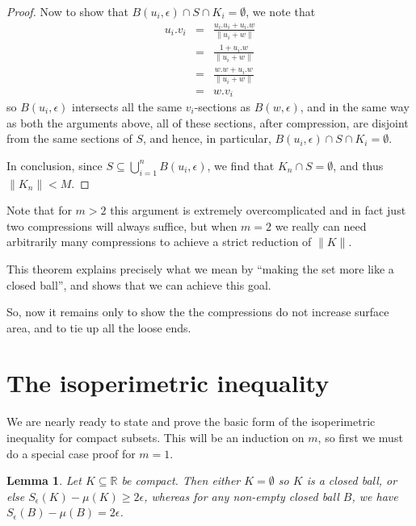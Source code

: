 \documentclass[a4paper,11pt]{article}
\newcommand{\bbR}{\mathbb{R}}
\newcommand{\lV}{\lVert}
\newcommand{\rV}{\rVert}
\newtheorem{lemma}[thm]{Lemma}
\begin{document}
\begin{proof}
Now to show that $B(u_i,\epsilon)\cap S\cap K_{i}=\emptyset$, we note that
%
\begin{eqnarray*}
  u_i.v_i
  &=& \frac{u_i.u_i+u_i.w}{\lV u_i+w\rV} \\
  &=& \frac{1+u_i.w}{\lV u_i+w\rV} \\
  &=& \frac{w.w+u_i.w}{\lV u_i+w\rV} \\
  &=& w.v_i
\end{eqnarray*}
%
so $B(u_i,\epsilon)$ intersects all the same $v_i$-sections as
$B(w,\epsilon)$, and in the same way as both the arguments above,
all of these sections, after
compression, are disjoint from the same sections of $S$, and hence,
in particular,
$B(u_i,\epsilon)\cap S\cap K_{i}=\emptyset$.

In conclusion, since $S\subseteq\bigcup_{i=1}^n B(u_i,\epsilon)$, we find
that $K_n\cap S=\emptyset$, and thus $\lV K_n\rV<M$.
\end{proof}

Note that for $m>2$ this argument is extremely overcomplicated and in fact just
two compressions will always suffice, but when $m=2$ we really can need
arbitrarily many compressions to achieve a strict reduction of $\lV K\rV$.

This theorem explains precisely what we mean by ``making the set more like a
closed ball'', and shows that we can achieve this goal.

So, now it remains only to show the the compressions do not increase surface
area, and to tie up all the loose ends.

\section{The isoperimetric inequality}
We are nearly ready to state and prove the basic form of the
isoperimetric inequality for compact subsets.  This will be an induction on
$m$, so first we must do a special case proof for $m=1$.

\begin{lemma}
Let $K\subseteq\bbR$ be compact.  Then either $K=\emptyset$ so $K$ is a closed
ball, or else $S_\epsilon(K)-\mu(K)\geq 2\epsilon$,
whereas for any non-empty closed
ball $B$, we have $S_\epsilon(B)-\mu(B)=2\epsilon$.
\end{lemma}
\end{document}
